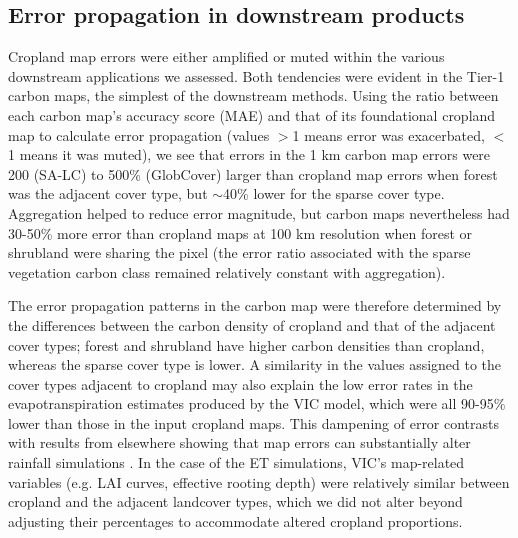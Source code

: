 \documentclass[a4paper]{article}
\begin{document}
\vspace{-0.3 cm}
\subsection*{Error propagation in downstream products}
\vspace{-0.2 cm}
Cropland map errors were either amplified or muted within the various downstream applications we assessed. Both tendencies were evident in the Tier-1 carbon maps, the simplest of the downstream methods. Using the ratio between each carbon map's accuracy score (MAE) and that of its foundational cropland map to calculate error propagation (values $>$1 means error was exacerbated, $<$1 means it was muted), we see that errors in the 1 km carbon map errors were 200 (SA-LC) to 500\% (GlobCover) larger than cropland map errors when forest was the adjacent cover type, but $\sim$40\% lower for the sparse cover type.  Aggregation helped to reduce error magnitude, but carbon maps nevertheless had 30-50\% more error than cropland maps at 100 km resolution when forest or shrubland were sharing the pixel (the error ratio associated with the sparse vegetation carbon class remained relatively constant with aggregation).  

The error propagation patterns in the carbon map were therefore determined by the differences between the carbon density of cropland and that of the adjacent cover types; forest and shrubland have higher carbon densities than cropland, whereas the sparse cover type is lower. A similarity in the values assigned to the cover types adjacent to cropland may also explain the low error rates in the evapotranspiration estimates produced by the VIC model, which were all 90-95\% lower than those in the input cropland maps. This dampening of error contrasts with results from elsewhere showing that map errors can substantially alter rainfall simulations \citep{ge_impacts_2007}. In the case of the ET simulations, VIC's map-related variables (e.g. LAI curves, effective rooting depth) were relatively similar between cropland and the adjacent landcover types, which we did not alter beyond adjusting their percentages to accommodate altered cropland proportions. 
\end{document}
